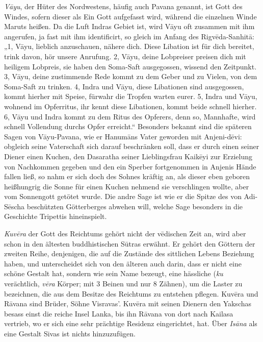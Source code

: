 \documentclass{article}
\begin{document}
\emph{V\={a}yu}, der Hüter des Nordwestens, häufig auch Pavana genannt, ist Gott des Windes, sofern dieser als Ein Gott aufgefasst wird, während die einzelnen Winde Maruts heißen. Da die Luft Indras Gebiet ist, wird V\={a}yu oft zusammen mit ihm angerufen, ja fast mit ihm identificirt, so gleich im Anfang des Rigv\={e}da-Sanhit\={a}: „1, V\={a}yu, lieblich anzuschauen, nähere dich. Diese Libation ist für dich bereitet, trink davon, hör unsere Anrufung. 2, V\={a}yu, deine Lobpreiser preisen dich mit heiligem Lobpreis, sie haben den Soma-Saft ausgegossen, wissend den Zeitpunkt. 3, V\={a}yu, deine zustimmende Rede kommt zu dem Geber und zu Vielen, von dem Soma-Saft zu trinken. 4, Indra und V\={a}yu, diese Libationen sind ausgegossen, kommt hierher mit Speise, fürwahr die Tropfen warten eurer. 5, Indra und V\={a}yu, wohnend im Opferritus, ihr kennt diese Libationen, kommt beide schnell hierher. 6, V\={a}yu und Indra kommt zu dem Ritus des Opferers, denn so, Mannhafte, wird schnell Vollendung durchs Opfer erreicht.“ Besonders bekannt sind die späteren Sagen von V\={a}yu-Pavana, wie er Hanum\={a}ns Vater geworden mit Anjeni-d\={e}vi: obgleich seine Vaterschaft sich darauf beschränken soll, dass er durch einen seiner Diener einen Kuchen, den Dasaratha seiner Lieblingsfrau Kaik\={e}yi zur Erzielung von Nachkommen gegeben und den ein Sperber fortgenommen in Anjenis Hände fallen ließ, so nahm er sich doch des Sohnes kräftig an, als dieser eben geboren heißhungrig die Sonne für einen Kuchen nehmend sie verschlingen wollte, aber vom Sonnengott getötet wurde. Die andre Sage ist wie er die Spitze des von Adi-S\={e}scha beschützten Götterberges abwehen will, welche Sage besonders in die Geschichte Tripettis hineinspielt.

\emph{Kuv\={e}ra} der Gott des Reichtums gehört nicht der v\={e}dischen Zeit an, wird aber schon in den ältesten buddhistischen S\={u}tras erwähnt. Er gehört den Göttern der zweiten Reihe, denjenigen, die auf die Zustände des sittlichen Lebens Beziehung haben, und unterscheidet sich von den älteren auch darin, dass er nicht eine schöne Gestalt hat, sondern wie sein Name bezeugt, eine hässliche (\emph{ku} verächtlich, \emph{v\={e}ra} Körper; mit 3 Beinen und nur 8 Zähnen), um die Laster zu bezeichnen, die aus dem Besitze des Reichtums zu entstehen pflegen. Kuv\={e}ra und R\={a}vana sind Brüder, Söhne Visravas'. Kuv\={e}ra mit seinen Dienern den Yakschas besass einst die reiche Insel Lanka, bis ihn R\={a}vana von dort nach Kailasa vertrieb, wo er sich eine sehr prächtige Residenz eingerichtet, hat. Über \emph{Is\={a}na} als eine Gestalt Sivas ist nichts hinzuzufügen.
\end{document}
